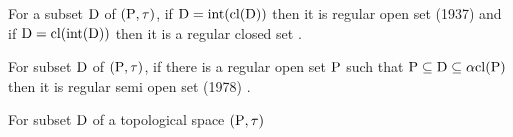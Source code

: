 \begin{dfn}\label{dfn1.2.5}
For a subset $\mathrm{D}$ of $(\mathrm{P}, \tau)$, if $\mathrm{D} = \mbox{int} (\mathrm{cl}(\mathrm{D}))$ then it is regular open set (1937) and if $\mathrm{D} = \mathrm{cl}(\mbox{int}(\mathrm{D}))$ then it is a regular closed set \cite{Long}.
\end{dfn}

\begin{dfn}\label{dfn1.2.6}
For subset $\mathrm{D}$ of $(\mathrm{P}, \tau)$, if there is a regular open set $\mathrm{P}$ such that $\mathrm{P} \subseteq \mathrm{D} \subseteq \alpha \mathrm{cl}(\mathrm{P})$ then it is regular semi open set (1978) \cite{Cameron}. 
\end{dfn}


\begin{dfn}\label{dfn1.2.7}
For subset $\mathrm{D}$ of a topological space $(\mathrm{P}, \tau)$ 
\end{dfn}

